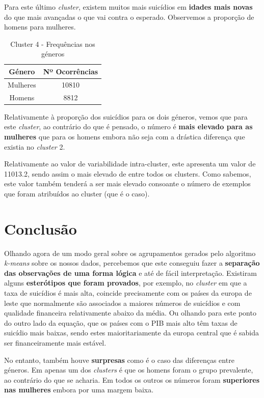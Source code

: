 \documentclass[a4paper,12pt]{article}
\begin{document}
Para este último \textit{cluster}, existem muitos mais suicídios em \textbf{idades mais novas} do que mais avançadas o que vai contra o esperado. 
Observemos a proporção de homens para mulheres.

\begin{table}[H]
	\centering
	\caption{Cluster 4 - Frequências nos géneros}
	\begin{tabular}{|c|c|} 
		\hline
		\rowcolor[rgb]{0.2,0.7,0.6} Género   & Nº Ocorrências  \\ 
		\hline
		Mulheres & 10810            \\ 
		\hline
		Homens & 8812            \\
		\hline
	\end{tabular}
\end{table}

Relativamente à proporção dos suicídios para os dois géneros, vemos que para este \textit{cluster}, ao contrário do que é pensado, o número é \textbf{mais elevado para as mulheres} que para os homens embora não seja com a drástica diferença que existia no \textit{cluster} 2.

Relativamente ao valor de variabilidade intra-cluster, este apresenta um valor de 11013.2, sendo assim o mais elevado de entre todos os clusters. Como sabemos, este valor também tenderá a ser mais elevado consoante o número de exemplos que foram atribuídos ao cluster (que é o caso).

\section{Conclusão}

Olhando agora de um modo geral sobre os agrupamentos gerados pelo algoritmo \textit{k-means} sobre os nossos dados, percebemos que este conseguiu fazer a \textbf{separação das observações de uma forma lógica} e até de fácil interpretação. Existiram alguns \textbf{esterótipos que foram provados}, por exemplo, no \textit{cluster} em que a taxa de suicídios é mais alta, coincide precisamente com os países da europa de leste que normalmente são associados a maiores números de suicídios e com qualidade financeira relativamente abaixo da média. Ou olhando para este ponto do outro lado da equação, que os países com o PIB mais alto têm taxas de suicídio mais baixas, sendo estes maioritariamente da europa central que é sabida ser financeiramente mais estável.


No entanto, também houve \textbf{surpresas} como é o caso das diferenças entre géneros. Em apenas um dos \textit{clusters} é que os homens foram o grupo prevalente, ao contrário do que se acharia. Em todos os outros os números foram \textbf{superiores nas mulheres} embora por uma margem baixa.
\end{document}
